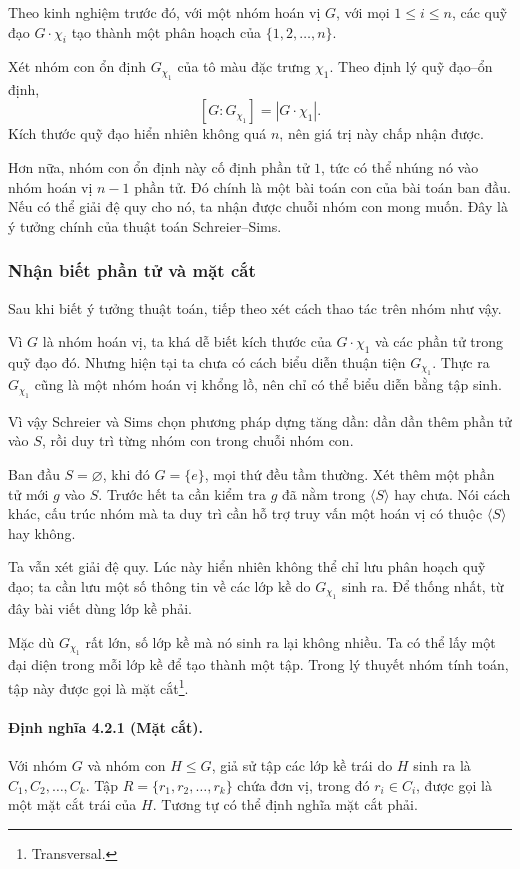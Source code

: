 \documentclass[11pt]{article}
\begin{document}
Theo kinh nghiệm trước đó, với một nhóm hoán vị \(G\), với mọi \(1\le i\le n\),
các quỹ đạo \(G\cdot\chi_i\) tạo thành một phân hoạch của
\(\{1,2,\ldots,n\}\).

Xét nhóm con ổn định \(G_{\chi_1}\) của tô màu đặc trưng \(\chi_1\). Theo định
lý quỹ đạo--ổn định,
\[
  [G:G_{\chi_1}]=|G\cdot\chi_1|.
\]
Kích thước quỹ đạo hiển nhiên không quá \(n\), nên giá trị này chấp nhận được.

Hơn nữa, nhóm con ổn định này cố định phần tử \(1\), tức có thể nhúng nó vào
nhóm hoán vị \(n-1\) phần tử. Đó chính là một bài toán con của bài toán ban
đầu. Nếu có thể giải đệ quy cho nó, ta nhận được chuỗi nhóm con mong muốn. Đây
là ý tưởng chính của thuật toán Schreier--Sims.

\subsubsection{Nhận biết phần tử và mặt cắt}

Sau khi biết ý tưởng thuật toán, tiếp theo xét cách thao tác trên nhóm như vậy.

Vì \(G\) là nhóm hoán vị, ta khá dễ biết kích thước của \(G\cdot\chi_1\) và các
phần tử trong quỹ đạo đó. Nhưng hiện tại ta chưa có cách biểu diễn thuận tiện
\(G_{\chi_1}\). Thực ra \(G_{\chi_1}\) cũng là một nhóm hoán vị khổng lồ, nên
chỉ có thể biểu diễn bằng tập sinh.

Vì vậy Schreier và Sims chọn phương pháp dựng tăng dần: dần dần thêm phần tử
vào \(S\), rồi duy trì từng nhóm con trong chuỗi nhóm con.

Ban đầu \(S=\varnothing\), khi đó \(G=\{e\}\), mọi thứ đều tầm thường. Xét thêm
một phần tử mới \(g\) vào \(S\). Trước hết ta cần kiểm tra \(g\) đã nằm trong
\(\langle S\rangle\) hay chưa. Nói cách khác, cấu trúc nhóm mà ta duy trì cần
hỗ trợ truy vấn một hoán vị có thuộc \(\langle S\rangle\) hay không.

Ta vẫn xét giải đệ quy. Lúc này hiển nhiên không thể chỉ lưu phân hoạch quỹ
đạo; ta cần lưu một số thông tin về các lớp kề do \(G_{\chi_1}\) sinh ra. Để
thống nhất, từ đây bài viết dùng lớp kề phải.

Mặc dù \(G_{\chi_1}\) rất lớn, số lớp kề mà nó sinh ra lại không nhiều. Ta có
thể lấy một đại diện trong mỗi lớp kề để tạo thành một tập. Trong lý thuyết
nhóm tính toán, tập này được gọi là mặt cắt\footnote{Transversal.}.

\paragraph{Định nghĩa 4.2.1 (Mặt cắt).}
Với nhóm \(G\) và nhóm con \(H\le G\), giả sử tập các lớp kề trái do \(H\) sinh
ra là \(C_1,C_2,\ldots,C_k\). Tập \(R=\{r_1,r_2,\ldots,r_k\}\) chứa đơn vị,
trong đó \(r_i\in C_i\), được gọi là một mặt cắt trái của \(H\). Tương tự có
thể định nghĩa mặt cắt phải.
\end{document}
